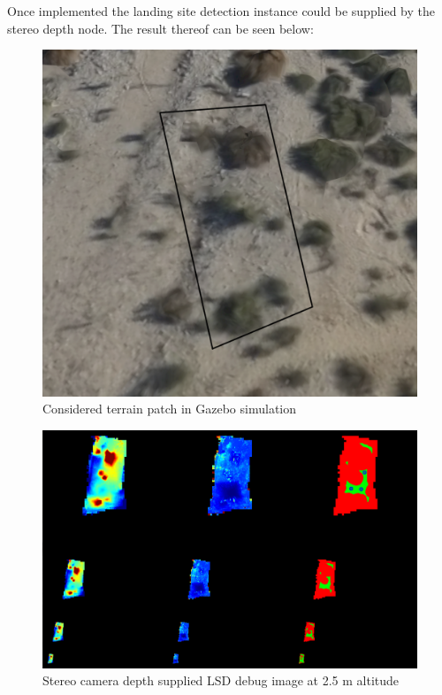 Once implemented the landing site detection instance could be supplied by the stereo depth node. The result thereof can be seen below:

\begin{figure}[ht!]
    \centering
    \includegraphics[scale=0.2, angle=-12]{images/preparation/reference_map2.5m_annotated.png}
    \caption{Considered terrain patch in Gazebo simulation}
    \label{stereo_reference}
\end{figure}

\begin{figure}[ht!]
    \centering
    \includegraphics[scale=0.25]{images/preparation/stereo_2.5m.png}
    \caption{Stereo camera depth supplied LSD debug image at 2.5 m altitude}
    \label{qual_stereo_test}
\end{figure}


